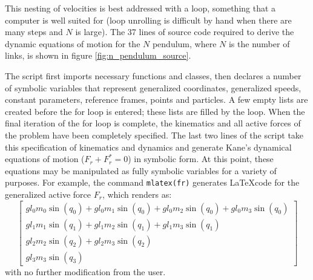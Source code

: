 \documentclass[twocolumn,10pt]{asme2e}
\begin{document}
This nesting of velocities is best addressed with a loop, something
that a computer is well suited for (loop unrolling is difficult by hand when
there are many steps and $N$ is large). The 37 lines of source code required to
derive the dynamic equations of motion for the $N$ pendulum, where $N$ is
the number of links, is shown in figure \ref{fig:n_pendulum_source}.

The script first imports necessary functions and classes, then declares a
number of symbolic variables that represent generalized coordinates,
generalized speeds, constant parameters, reference frames, points and
particles. A few empty lists are created before the for loop is entered; these
lists are filled by the loop.  When the final iteration of the for loop is
complete, the kinematics and all active forces of the problem have been
completely specified. The last two lines of the script take this specification
of kinematics and dynamics and generate Kane's dynamical equations of motion
($F_r + F_r^* = 0$) in symbolic form. At this point, these equations may be
manipulated as fully symbolic variables for a variety of purposes. For example,
the command \verb|mlatex(fr)| generates \LaTeX code for the generalized active
force $F_r$, which renders as:
\begin{equation}
\left[\begin{smallmatrix}g l_{0} m_{0} \operatorname{sin}\left(q_{0}\right) + g l_{0} m_{1} \operatorname{sin}\left(q_{0}\right) + g l_{0} m_{2} \operatorname{sin}\left(q_{0}\right) + g l_{0} m_{3} \operatorname{sin}\left(q_{0}\right)\\g l_{1} m_{1} \operatorname{sin}\left(q_{1}\right) + g l_{1} m_{2} \operatorname{sin}\left(q_{1}\right) + g l_{1} m_{3} \operatorname{sin}\left(q_{1}\right)\\g l_{2} m_{2} \operatorname{sin}\left(q_{2}\right) + g l_{2} m_{3} \operatorname{sin}\left(q_{2}\right)\\g l_{3} m_{3} \operatorname{sin}\left(q_{3}\right)\end{smallmatrix}\right]
\end{equation}
with no further modification from the user.
\end{document}
